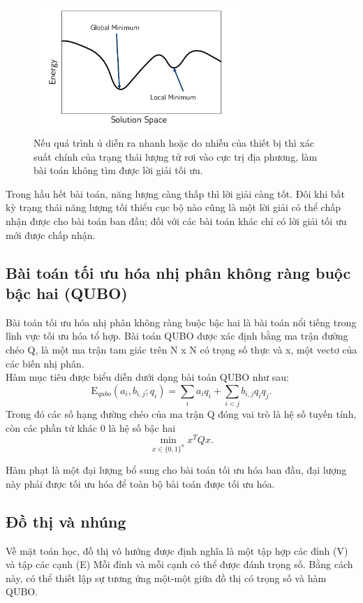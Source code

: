 \begin{figure}[H]
    \centering
    \includegraphics[width=0.7\textwidth]{images/objective_function.png}
    \caption{Nếu quá trình ủ diễn ra nhanh hoặc do nhiễu của thiết bị thì xác suất chính của trạng thái lượng tử rơi vào cực trị địa phương, làm bài toán không tìm được lời giải tối ưu.}
    \label{fig: Đồ thị năng lượng hàm mục tiêu}
\end{figure}

Trong hầu hết bài toán, năng lượng càng thấp thì lời giải càng tốt. Đôi khi bất kỳ trạng thái năng lượng tối thiểu cục bộ nào cũng là một lời giải có thể chấp nhận được cho bài toán ban đầu; đối với các bài toán khác chỉ có lời giải tối ưu mới được chấp nhận.

\subsection{Bài toán tối ưu hóa nhị phân không ràng buộc bậc hai (QUBO)}
Bài toán tối ưu hóa nhị phân không ràng buộc bậc hai là bài toán nổi tiếng trong lĩnh vực tối ưu hóa tổ hợp.
Bài toán QUBO được xác định bằng ma trận đường chéo Q, là một ma trận tam giác trên N x N  có trọng số thực và x, một vectơ của các biến nhị phân.\\
Hàm mục tiêu được biểu diễn dưới dạng bài toán QUBO như sau:
\[\text{E}_{qubo}(a_i, b_{i,j}; q_i) = \sum_{i} a_i q_i + \sum_{i<j} b_{i,j} q_i q_j.
\]
Trong đó các số hạng đường chéo của ma trận Q đóng vai trò là hệ số tuyến tính, còn các phần tử khác 0 là hệ số bậc hai
\[\min_{{x} \in {\{0,1\}^n}} {x}^{T} {Q}{x}.
\]

Hàm phạt là một đại lượng bổ sung cho bài toán tối ưu hóa ban đầu, đại lượng này phải được tối ưu hóa để toàn bộ bài toán được tối ưu hóa.

\subsection{Đồ thị và nhúng}
Về mặt toán học, đồ thị vô hướng được định nghĩa là một tập hợp các đỉnh
(V) và tập các cạnh (E)
Mỗi đỉnh và mỗi cạnh có thể được đánh trọng số.
Bằng cách này, có thể thiết lập sự tương ứng một-một giữa đồ thị có trọng số và hàm QUBO.

